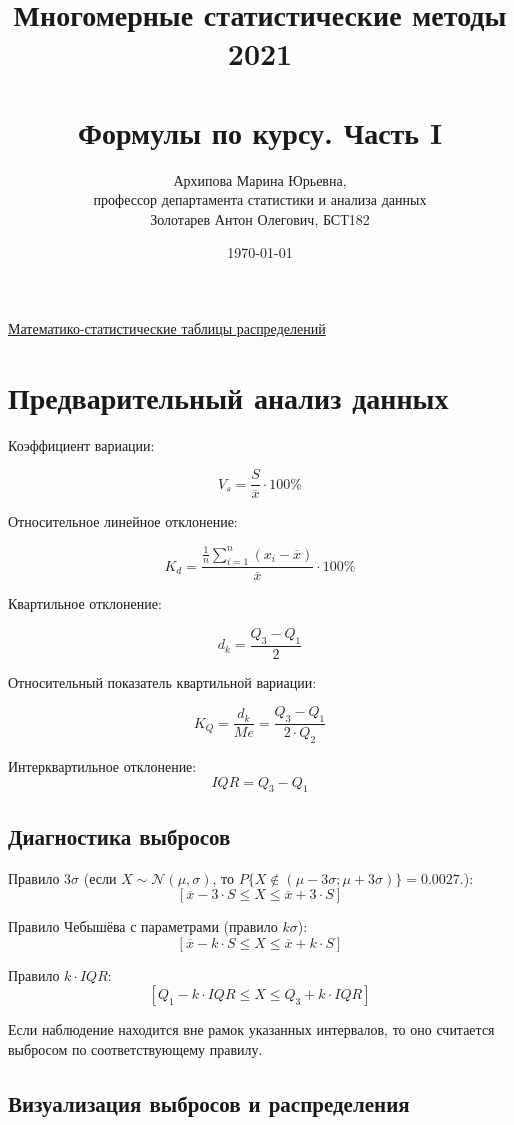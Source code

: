 \documentclass[a4paper,12pt]{article} %
\author{Архипова Марина Юрьевна, \\
профессор департамента статистики и анализа данных \\
Золотарев Антон Олегович, БСТ182}
\title{Многомерные статистические методы 2021 \\
\\

\large Формулы по курсу. Часть I}
\date{\today}
\begin{document}

\maketitle

\tableofcontents

\href{https://github.com/Shred27/MSM/blob/main/Table_of_distributions_Mironkina.pdf}{Математико-статистические таблицы распределений}

\section{Предварительный анализ данных}

Коэффициент вариации:

\[V_s=\frac{S}{\overline{x}}\cdot 100\%\]

Относительное линейное отклонение:

\[K_d = \frac{\frac{1}{n}\sum\limits_{i=1}^{n}(x_i-\overline{x})}{\overline{x}}\cdot100\%\]

Квартильное отклонение:

\[d_k=\frac{Q_3-Q_1}{2}\]

Относительный показатель квартильной вариации:

\[K_Q=\frac{d_k}{Me}=\frac{Q_3-Q_1}{2\cdot Q_2}\]

Интерквартильное отклонение:
\[IQR=Q_3-Q_1\]

\subsection{Диагностика выбросов}

Правило $3\sigma$ (если $X \sim \mathcal{N} (\mu, \sigma)$, то $P\{X \notin (\mu-3\sigma; \mu+3\sigma)\} = 0.0027$.):
\[\left[\overline{x}-3\cdot S\le X \le \overline{x}+3\cdot S\right]\]

Правило Чебышёва с параметрами (правило $k\sigma$): 
\[\left[\overline{x}-k\cdot S\le X \le \overline{x}+k\cdot S\right]\]

Правило $k\cdot IQR$:
\[\left[Q_1-k\cdot IQR\le X \le Q_3+k\cdot IQR\right]\]

Если наблюдение находится вне рамок указанных интервалов, то оно считается выбросом по соответствующему правилу.

\subsection{Визуализация выбросов и распределения}
\end{document}
